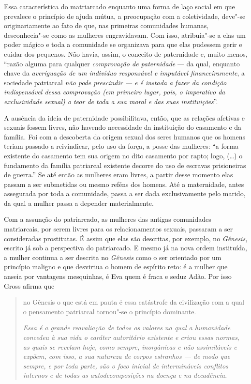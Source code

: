 Essa característica do matriarcado enquanto uma forma de laço social em
que prevalece o princípio de ajuda mútua, a preocupação com a
coletividade, deve"-se originariamente ao fato de que, nas primeiras
comunidades humanas, desconhecia"-se como as mulheres engravidavam. Com
isso, atribuía"-se a elas um poder mágico e toda a comunidade se
organizava para que elas pudessem gerir e cuidar dos pequenos. Não
havia, assim, o conceito de paternidade e, muito menos, ``razão alguma
para qualquer \emph{comprovação de paternidade} --- da qual, enquanto
chave da \emph{averiguação de um indivíduo responsável e imputável
financeiramente}, a sociedade patriarcal \emph{não pode prescindir --- e
é instada a fazer da condição indispensável dessa comprovação (em
primeiro lugar, pois, o imperativo da exclusividade sexual) o teor de
toda a sua moral e das suas instituições}''.

A ausência da ideia de paternidade possibilitava, então, que as relações
afetivas e sexuais fossem livres, não havendo necessidade da instituição
do casamento e da família. Foi com a descoberta da origem sexual dos
seres humanos que os homens teriam passado a reivindicar, pelo uso da
força, a posse das mulheres: ``a forma existente do casamento tem sua
origem no dito casamento por rapto; logo, (\ldots{}) o fundamento da família
patriarcal existente decorre do uso de escravas prisioneiras de guerra.''
Se até então as mulheres eram livres, a partir desse momento elas
passam a ser submetidas ou mesmo reféns dos homens. Até a maternidade,
antes assegurada por toda a comunidade, passa a ser dada exclusivamente
pelo marido, da qual a mulher passa a depender materialmente.

Com a assunção do patriarcado, as mulheres das antigas comunidades
matriarcais, por serem livres para os relacionamentos sexuais, passaram
a ser consideradas prostitutas. É assim que elas são descritas, por
exemplo, no \emph{Gênesis}, escrito já sob a perspectiva do patriarcado.
E mesmo já na nova ordem instituída, a mulher continua a ser descrita no
\emph{Gênesis} como o ser orientado por um princípio maligno e que
desvirtua o homem de espírito reto: é a mulher que anseia por vantagens
mesquinhas, é Eva quem é fraca e seduz Adão. Por isso Gross afirma que

\begin{quote}
no Gênesis o que está em pauta é essa catástrofe da civilização com a
qual o pensamento patriarcal tornou"-se o princípio dominante.

\emph{Essa é a grande reavaliação de todos os valores na qual a
humanidade concedeu à sua vida o caráter autoritário existente e criou
essas normas, as quais se revelam hoje, como sempre, inorgânicas e não
assimiláveis e expõem, com isso, a sua natureza de corpos estranhos ---
de modo que sempre, e por toda parte, são o foco inicial de
intermináveis conflitos internos e de todas as autodecomposições na
doença e na decadência}.
\end{quote}

